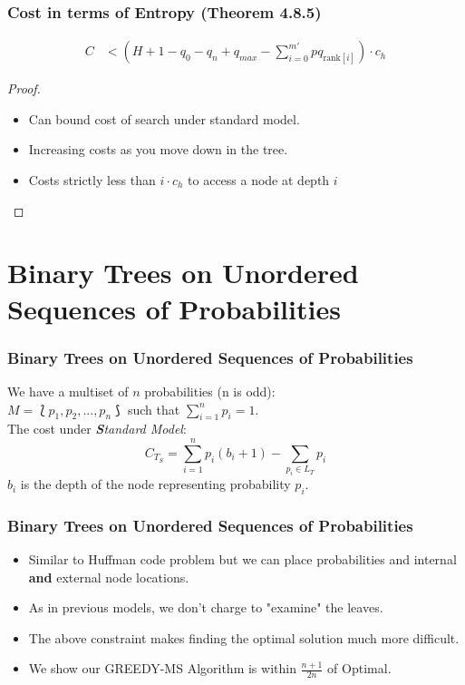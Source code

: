 \documentclass{beamer}
\theoremstyle{plain}
\begin{document}
\begin{frame}\frametitle{Cost in terms of Entropy (Theorem 4.8.5)}
\begin{align*}
C &<  \left(H + 1 - q_0 - q_n + q_{max} - \sum_{i=0}^{m'} pq_{\text{rank}[i]} \right)\cdot c_h
\end{align*}
\begin{proof}
\begin{itemize}
\item Can bound cost of search under standard model.
\item Increasing costs as you move down in the tree.
\item Costs strictly less than $i \cdot c_h$ to access a node at depth $i$
\end{itemize}
\end{proof}
\end{frame}


\section{Binary Trees on Unordered Sequences of Probabilities}\label{BST over Multisets}

\begin{frame} \frametitle{Binary Trees on Unordered Sequences of Probabilities}
We have a multiset of $n$ probabilities (n is odd): \\
$M = \lbag p_1, p_2, ..., p_n \rbag$ such that $\sum\limits_{i=1}^n p_i = 1$.  \\
The cost under \textit{\textbf{S}tandard Model}:
\begin{equation}
C_{T_S} = \sum_{i=1}^{n} p_i(b_i+1) - \sum_{p_i \in L_T} p_i
\end{equation}
$b_i$ is the depth of the node representing probability $p_i$.
\end{frame}

\begin{frame} \frametitle{Binary Trees on Unordered Sequences of Probabilities}
\begin{itemize}
\item Similar to Huffman code problem but we can place probabilities and internal \textbf{and} external node locations.
\item As in previous models, we don't charge to "examine" the leaves.
\item The above constraint makes finding the optimal solution much more difficult.
\item We show our GREEDY-MS Algorithm is within $\frac{n+1}{2n}$ of Optimal.
\end{itemize}
\end{frame}
\end{document}

